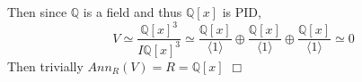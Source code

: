 \documentclass{article}
\begin{document}
Then since $\mathbb{Q}$ is a field and thus $\mathbb{Q}[x]$ is PID,
$$V \simeq \frac{\mathbb{Q}[x]^3}{I\mathbb{Q}[x]^3} \simeq \frac{\mathbb{Q}[x]}{\langle 1 \rangle} \oplus \frac{\mathbb{Q}[x]}{\langle 1 \rangle} \oplus \frac{\mathbb{Q}[x]}{\langle 1 \rangle} \simeq 0$$
Then trivially $Ann_R(V) = R = \mathbb{Q}[x]$ $\Box$
\end{document}
